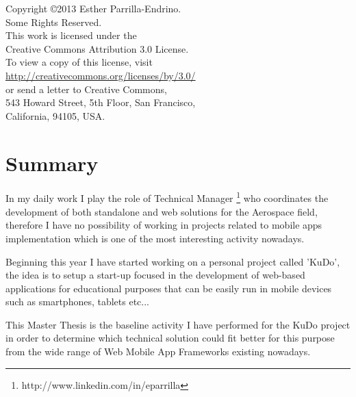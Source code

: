 \documentclass[a4paper,12pt]{book}
\begin{document}
\newpage
\thispagestyle{empty}
\vspace{5cm}
\begin{flushright}
\begin{large}
Copyright \copyright 2013 Esther Parrilla-Endrino.\\
Some Rights Reserved.\\
This work is licensed under the\\
Creative Commons Attribution 3.0 License.\\
To view a copy of this license, visit\\
\url{http://creativecommons.org/licenses/by/3.0/}\\
or send a letter to Creative Commons,\\
543 Howard Street, 5th Floor, San Francisco,\\
California, 94105, USA.\\
\end{large}
\end{flushright}

\newpage

\tableofcontents  %

\renewcommand{\refname}{Bibliography}
\addtolength{\parskip}{\baselineskip}


\chapter*{Summary}
\label{chap:summary}

In my daily work I play the role of Technical Manager \footnote{http://www.linkedin.com/in/eparrilla} who coordinates the development of both standalone and web solutions for the Aerospace field, therefore I have no possibility of working in projects related to mobile apps implementation which is one of the most interesting activity nowadays.

Beginning this year I have started working on a personal project called 'KuDo', the idea is to setup a start-up focused in the development of web-based applications for educational purposes that can be easily run in mobile devices such as smartphones, tablets etc...

This Master Thesis is the baseline activity I have performed for the KuDo project in order to determine which technical solution could fit better for this purpose from the wide range of Web Mobile App Frameworks existing nowadays.
\end{document}
